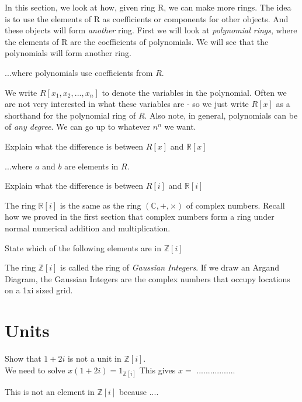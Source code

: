 In this section, we look at how, given ring R, we can make more rings.
The idea is to use the elements of R as coefficients or components for other objects.
And these objects will form \textit{another} ring. First we will look at \textit{polynomial rings}, 
where the elements of R are the coefficients of polynomials. We will see that the polynomials 
will form another ring.



...where polynomials use coefficients from $R$. 

We write $R[x_1, x_2, ..., x_n]$ to denote the variables in the polynomial. Often we are not very 
interested in what these variables are - so we just write $R[x]$ as a shorthand for the 
polynomial ring of $R$. Also note, in general, polynomials can be of \textit{any degree}. 
We can go up to whatever $n^{n}$ we want. 

\begin{example}
Explain what the difference is between $R[x]$ and $\mathbb{R}[x]$ 
\end{example}





...where $a$ and $b$ are elements in $R$. 

\begin{example}
Explain what the difference is between $R[i]$ and $\mathbb{R}[i]$ 
\end{example}


The ring $\mathbb{R}[i]$ is the same as the ring $(\mathbb{C}, +, \times)$ of complex numbers. 
Recall how we proved in the first section that complex numbers form a ring under normal 
numerical addition and multiplication. 

\begin{example}
State which of the following elements are in $\mathbb{Z}[i]$ 
\end{example}

The ring $\mathbb{Z}[i]$ is called the ring of \textit{Gaussian Integers}. If we draw an Argand Diagram, 
the Gaussian Integers are the complex numbers that occupy locations on a 1xi sized grid. 


\section{Units}


\begin{example}
Show that $1+2i$ is not a unit in $\mathbb{Z}[i]$. \\
We need to solve $x(1+2i) = 1_{\mathbb{Z}[i]}$ This gives $x = $ .................


This is not an element in $\mathbb{Z}[i]$ because ....

\end{example}
